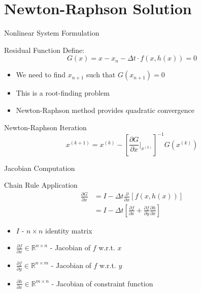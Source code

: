 \documentclass[10pt]{beamer}
\newcommand{\R}{\mathbb{R}}
\begin{document}
\section{Newton-Raphson Solution}

\begin{frame}{Nonlinear System Formulation}
\begin{block}{Residual Function}
Define:
\begin{equation}
G(x) = x - x_n - \Delta t \cdot f(x, h(x)) = 0
\end{equation}
\end{block}

\begin{itemize}
\item We need to find $x_{n+1}$ such that $G(x_{n+1}) = 0$
\item This is a root-finding problem
\item Newton-Raphson method provides quadratic convergence
\end{itemize}

\pause
\begin{block}{Newton-Raphson Iteration}
\begin{equation}
x^{(k+1)} = x^{(k)} - \left[\frac{\partial G}{\partial x}\bigg|_{x^{(k)}}\right]^{-1} G(x^{(k)})
\end{equation}
\end{block}
\end{frame}

\begin{frame}{Jacobian Computation}
\begin{block}{Chain Rule Application}
\begin{align}
\frac{\partial G}{\partial x} &= I - \Delta t \frac{\partial}{\partial x}[f(x, h(x))] \\
&= I - \Delta t \left[\frac{\partial f}{\partial x} + \frac{\partial f}{\partial y}\frac{\partial h}{\partial x}\right]
\end{align}
\end{block}

\begin{itemize}
\item $I$ - $n \times n$ identity matrix
\item $\frac{\partial f}{\partial x} \in \R^{n \times n}$ - Jacobian of $f$ w.r.t. $x$
\item $\frac{\partial f}{\partial y} \in \R^{n \times m}$ - Jacobian of $f$ w.r.t. $y$
\item $\frac{\partial h}{\partial x} \in \R^{m \times n}$ - Jacobian of constraint function
\end{itemize}
\end{frame}
\end{document}
